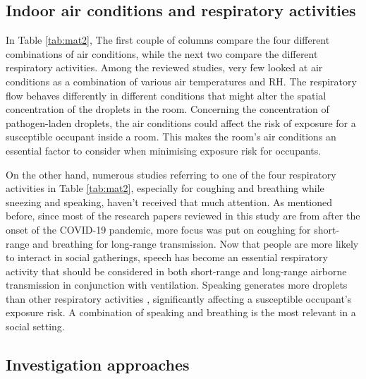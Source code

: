 \documentclass[a4paper,12pt]{elsarticle}
\begin{document}
\subsection{Indoor air conditions and respiratory activities}

In Table \ref{tab:mat2}, The first couple of columns compare the four different combinations of air conditions, while the next two compare the different respiratory activities. Among the reviewed studies, very few looked at air conditions as a combination of various air temperatures and RH. The respiratory flow behaves differently in different conditions that might alter the spatial concentration of the droplets in the room. Concerning the concentration of pathogen-laden droplets, the air conditions could affect the risk of exposure for a susceptible occupant inside a room. This makes the room's air conditions an essential factor to consider when minimising exposure risk for occupants.

On the other hand, numerous studies referring to one of the four respiratory activities in Table \ref{tab:mat2}, especially for coughing and breathing while sneezing and speaking, haven't received that much attention. As mentioned before, since most of the research papers reviewed in this study are from after the onset of the COVID-19 pandemic, more focus was put on coughing for short-range and breathing for long-range transmission. Now that people are more likely to interact in social gatherings, speech has become an essential respiratory activity that should be considered in both short-range and long-range airborne transmission in conjunction with ventilation. Speaking generates more droplets than other respiratory activities \cite{giri2022colliding}, significantly affecting a susceptible occupant's exposure risk. A combination of speaking and breathing is the most relevant in a social setting.

\subsection{Investigation approaches}
\end{document}
